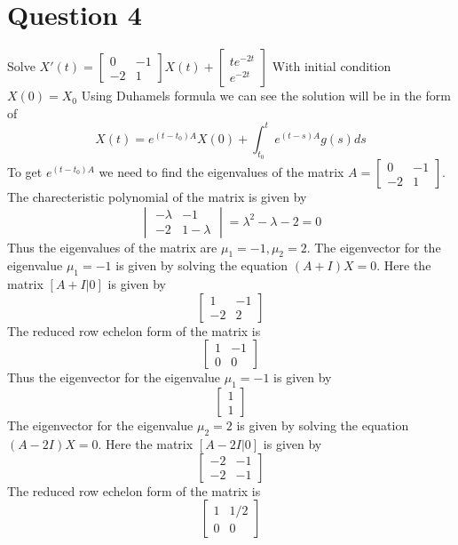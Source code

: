 \documentclass{article}
\begin{document}
\section*{Question 4}
Solve $X'(t) = \begin{bmatrix}
    0 & -1\\
    -2 & 1
\end{bmatrix}X(t) + \begin{bmatrix}
    te^{-2t}  \\
    e^{-2t}
\end{bmatrix}$
With initial condition $X(0) = X_0$
Using Duhamels formula we can see the solution will be in the form of 
$$X(t) = e^{(t-t_0)A}X(0) + \int_{t_0}^t e^{(t-s)A}g(s)ds$$ 
To get $e^{(t-t_0)A}$ we need to find the eigenvalues of the matrix $A = \begin{bmatrix}
    0 & -1\\
    -2 & 1
\end{bmatrix}$. The charecteristic polynomial of the matrix is given by
$$\begin{vmatrix}
    -\lambda & -1\\
    -2 & 1 - \lambda
\end{vmatrix} = \lambda^2 - \lambda - 2 = 0$$
Thus the eigenvalues of the matrix are $\mu_1 = -1, \mu_2 = 2$. 
The eigenvector for the eigenvalue $\mu_1 = -1$ is given by solving the equation $(A + I)X = 0$. Here the matrix $[A + I | 0]$ is given by
$$\begin{bmatrix}
    1 & -1\\
    -2 & 2
\end{bmatrix} $$
The reduced row echelon form of the matrix is
$$ \begin{bmatrix}
    1 & -1\\
    0 & 0
\end{bmatrix}$$
Thus the eigenvector for the eigenvalue $\mu_1 = -1$ is given by
$$\begin{bmatrix}
    1\\
    1
\end{bmatrix} $$
The eigenvector for the eigenvalue $\mu_2 = 2$ is given by solving the equation $(A - 2I)X = 0$. Here the matrix $[A - 2I | 0]$ is given by
$$\begin{bmatrix}
    -2 & -1\\
    -2 & -1
\end{bmatrix} $$
The reduced row echelon form of the matrix is
$$ \begin{bmatrix}
    1 & 1/2\\
    0 & 0
\end{bmatrix}$$
\end{document}
